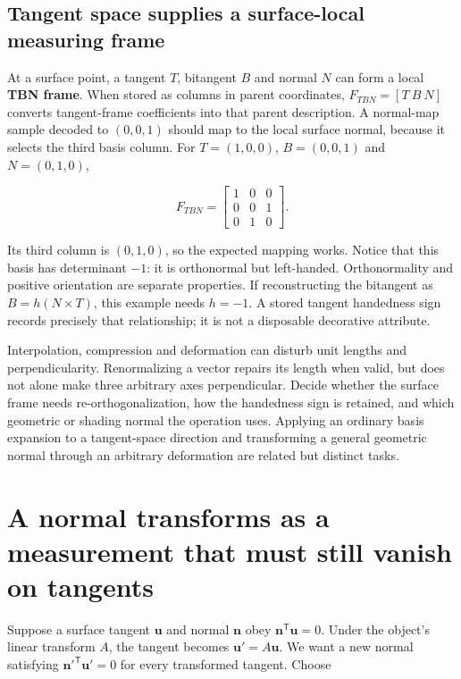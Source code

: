 \subsection{Tangent space supplies a surface-local measuring frame}\label{01-foundations-i-ch019-tangent-space-supplies-a-surface-local-measuring-frame}

At a surface point, a tangent \(T\), bitangent \(B\) and normal \(N\) can form a local \textbf{TBN frame}. When stored as columns in parent coordinates, \(F_{TBN}=[T\ B\ N]\) converts tangent-frame coefficients into that parent description. A normal-map sample decoded to \((0,0,1)\) should map to the local surface normal, because it selects the third basis column. For \(T=(1,0,0)\), \(B=(0,0,1)\) and \(N=(0,1,0)\),

\[
F_{TBN}=\begin{bmatrix}1&0&0\\0&0&1\\0&1&0\end{bmatrix}.
\]

Its third column is \((0,1,0)\), so the expected mapping works. Notice that this basis has determinant \(-1\): it is orthonormal but left-handed. Orthonormality and positive orientation are separate properties. If reconstructing the bitangent as \(B=h(N\times T)\), this example needs \(h=-1\). A stored tangent handedness sign records precisely that relationship; it is not a disposable decorative attribute.

Interpolation, compression and deformation can disturb unit lengths and perpendicularity. Renormalizing a vector repairs its length when valid, but does not alone make three arbitrary axes perpendicular. Decide whether the surface frame needs re-orthogonalization, how the handedness sign is retained, and which geometric or shading normal the operation uses. Applying an ordinary basis expansion to a tangent-space direction and transforming a general geometric normal through an arbitrary deformation are related but distinct tasks.

\section{A normal transforms as a measurement that must still vanish on tangents}\label{01-foundations-i-ch019-a-normal-transforms-as-a-measurement-that-must-still-vanish-on-tangents}

Suppose a surface tangent \(\mathbf u\) and normal \(\mathbf n\) obey \(\mathbf n^{\mathsf T}\mathbf u=0\). Under the object's linear transform \(A\), the tangent becomes \(\mathbf u'=A\mathbf u\). We want a new normal satisfying \(\mathbf n'^{\mathsf T}\mathbf u'=0\) for every transformed tangent. Choose

